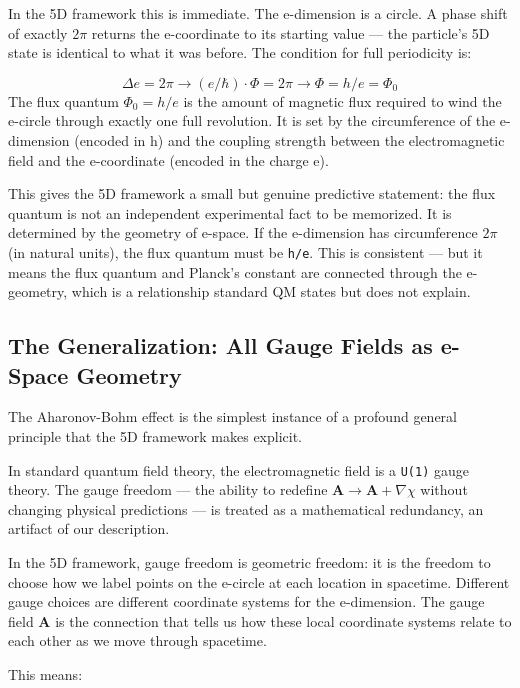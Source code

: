 \documentclass[aps,prd,preprint,superscriptaddress,longbibliography,floatfix]{revtex4-2}
\theoremstyle{remark}
\begin{document}
In the 5D framework this is immediate. The e-dimension is a circle. A phase shift of exactly $2\pi$ returns the e-coordinate to its starting value --- the particle's 5D state is identical to what it was before. The condition for full periodicity is:


\begin{equation}
    \Delta e = 2\pi  \to  (e/\hbar) \cdot \Phi = 2\pi  \to  \Phi = h/e = \Phi_{0}
\end{equation}
The flux quantum $\Phi_{0} = h/e$ is the amount of magnetic flux required to wind the e-circle through exactly one full revolution. It is set by the circumference of the e-dimension (encoded in h) and the coupling strength between the electromagnetic field and the e-coordinate (encoded in the charge e).

This gives the 5D framework a small but genuine predictive statement: the flux quantum is not an independent experimental fact to be memorized. It is determined by the geometry of e-space. If the e-dimension has circumference $2\pi$ (in natural units), the flux quantum must be \texttt{h/e}. This is consistent --- but it means the flux quantum and Planck's constant are connected through the e-geometry, which is a relationship standard QM states but does not explain.



\subsection{The Generalization: All Gauge Fields as e-Space Geometry}

The Aharonov-Bohm effect is the simplest instance of a profound general principle that the 5D framework makes explicit.

In standard quantum field theory, the electromagnetic field is a \texttt{U(1)} gauge theory. The gauge freedom --- the ability to redefine $\textbf{A} \to \textbf{A} + \nabla\chi$ without changing physical predictions --- is treated as a mathematical redundancy, an artifact of our description.

In the 5D framework, gauge freedom is geometric freedom: it is the freedom to choose how we label points on the e-circle at each location in spacetime. Different gauge choices are different coordinate systems for the e-dimension. The gauge field \textbf{A} is the connection that tells us how these local coordinate systems relate to each other as we move through spacetime.

This means:
\end{document}
